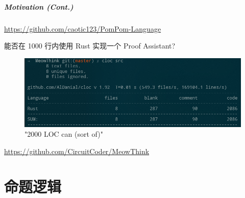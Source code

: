 \documentclass[UTF-8]{ctexbeamer}
\begin{document}
\begin{frame}
  \frametitle{Motivation (Cont.)}

  \url{https://github.com/caotic123/PomPom-Language}
  
  \pause

  \vspace{1em}

  能否在 1000 行内使用 Rust 实现一个 Proof Assistant?

  \pause

  \begin{figure}
    \includegraphics[width=\textwidth]{assets/cloc.png}
    \caption{"2000 LOC can (sort of)"}
  \end{figure}

  \url{https://github.com/CircuitCoder/MeowThink}

\end{frame}

\part{命题逻辑}
\frame{\partpage}
\end{document}
